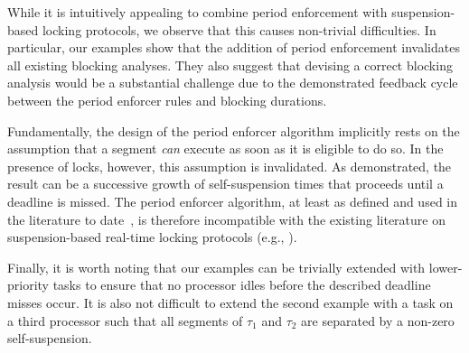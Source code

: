 While it is intuitively appealing to combine period enforcement with suspension-based locking protocols, we observe that this causes non-trivial difficulties. In particular, our examples show that the addition of period enforcement invalidates all existing blocking analyses. They also suggest that devising a correct blocking analysis would be a substantial challenge due to the demonstrated feedback cycle between the period enforcer rules and blocking durations. 


Fundamentally, the design of the period enforcer algorithm implicitly rests on the assumption that a segment \emph{can} execute as soon as it is eligible to do so. In the presence of locks, however, this assumption is invalidated. As demonstrated, the result can be a successive growth of self-suspension times that proceeds until a deadline is missed.  The period enforcer algorithm, at least as defined and used in the literature to date~\cite{Raj:suspension1991,Raj:91}, is therefore incompatible with the existing literature on suspension-based real-time locking protocols (e.g., \cite{Raj:91,Lak:11,LNR:09,BLBA:07,Br:13}). 


Finally, it is worth noting that our examples can be trivially extended with lower-priority tasks to ensure that no processor idles before the described deadline misses occur. It is also not difficult to extend the second example with a task on a third processor such that all segments of $\tau_1$ and $\tau_2$ are separated by a non-zero self-suspension.
